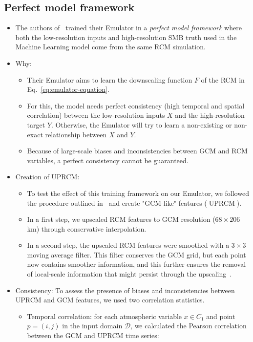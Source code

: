 \documentclass[a4paper,11pt,oneside]{report}
\begin{document}
\subsection{Perfect model framework}\label{subsec:perfect-model}
\begin{itemize}
    \item The authors of~\cite{Kittel} trained their Emulator in a \textit{perfect model framework} where both the low-resolution inputs and high-resolution SMB truth used in the Machine Learning model come from the same RCM simulation. 
    \item Why:
    \begin{itemize}
        \item Their Emulator aims to learn the downscaling function $F$ of the RCM in Eq.~\ref{eq:emulator-equation}.
        \item For this, the model needs perfect consistency (high temporal and spatial correlation) between the low-resolution inputs $X$ and the high-resolution target $Y$. Otherwise, the Emulator will try to learn a non-existing or non-exact relationship between $X$ and $Y$.
        \item Because of large-scale biases and inconsistencies between GCM and RCM variables, a perfect consistency cannot be guaranteed.
    \end{itemize}
    \item Creation of UPRCM: 
    \begin{itemize}
        \item To test the effect of this training framework on our Emulator, we followed the procedure outlined in~\cite{Doury} and create "GCM-like" features ($\operatorname{UPRCM}$).
        \item In a first step, we upscaled RCM features to GCM resolution ($68\times206$ km) through conservative interpolation. 
        \item In a second step, the upscaled RCM features were smoothed with a $3\times3$ moving average filter. This filter conserves the GCM grid, but each point now contains smoother information, and this further ensures the removal of local-scale information that might persist through the upscaling~\cite{Doury, Klaver2020}.
    \end{itemize}
    \item Consistency: To assess the presence of biases and inconsistencies between UPRCM and GCM features, we used two correlation statistics.  
    \begin{itemize}
        \item Temporal correlation: for each atmospheric variable $x\in C_1$ and point $p = (i,j)$ in the input domain $\mathcal{D}$, we calculated the Pearson correlation between the GCM and UPRCM time series:

\end{itemize}
\end{itemize}
\end{document}
